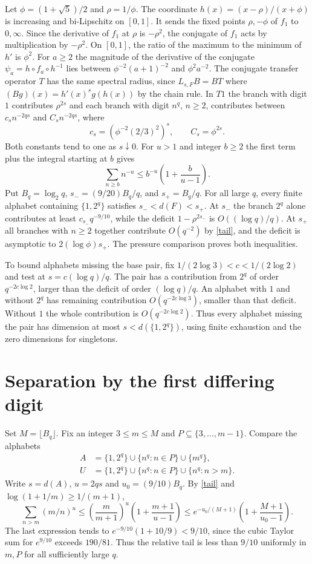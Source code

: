 \documentclass[11pt,a4paper]{amsart}
\begin{document}
Let $\phi=(1+\sqrt5)/2$ and $\rho=1/\phi$. The coordinate $h(x)=(x-\rho)/(x+\phi)$ is increasing and bi-Lipschitz on $[0,1]$. It sends the fixed points $\rho,-\phi$ of $f_1$ to $0,\infty$. Since the derivative of $f_1$ at $\rho$ is $-\rho^2$, the conjugate of $f_1$ acts by multiplication by $-\rho^2$. On $[0,1]$, the ratio of the maximum to the minimum of $h'$ is $\phi^2$. For $a\ge2$ the magnitude of the derivative of the conjugate $\psi_a=h\circ f_a\circ h^{-1}$ lies between $\phi^{-2}(a+1)^{-2}$ and $\phi^2a^{-2}$. The conjugate transfer operator $T$ has the same spectral radius, since $L_{s,F}B=BT$ where $(Bg)(x)=h'(x)^s g(h(x))$ by the chain rule. In $T1$ the branch with digit $1$ contributes $\rho^{2s}$ and each branch with digit $n^q$, $n\ge2$, contributes between $c_s n^{-2qs}$ and $C_s n^{-2qs}$, where
\[
c_s=(\phi^{-2}(2/3)^2)^s,\qquad C_s=\phi^{2s}.
\]
Both constants tend to one as $s\downarrow0$. For $u>1$ and integer $b\ge2$ the first term plus the integral starting at $b$ gives
\begin{equation}
\sum_{n\ge b}n^{-u}\le b^{-u}\left(1+\frac b{u-1}\right).
\label{tail}
\end{equation}
Put $B_q=\log_2q$, $s_-=(9/20) B_q/q$, and $s_+=B_q/q$. For all large $q$, every finite alphabet containing $\{1,2^q\}$ satisfies $s_-<d(F)<s_+$. At $s_-$ the branch $2^q$ alone contributes at least $c_{s_-}q^{-9/10}$, while the deficit $1-\rho^{2s_-}$ is $O((\log q)/q)$. At $s_+$ all branches with $n\ge2$ together contribute $O(q^{-2})$ by \eqref{tail}, and the deficit is asymptotic to $2(\log\phi)s_+$. The pressure comparison proves both inequalities.

To bound alphabets missing the base pair, fix $1/(2\log3)<c<1/(2\log2)$ and test at $s=c(\log q)/q$. The pair has a contribution from $2^q$ of order $q^{-2c\log 2}$, larger than the deficit of order $(\log q)/q$. An alphabet with $1$ and without $2^q$ has remaining contribution $O(q^{-2c\log 3})$, smaller than that deficit. Without $1$ the whole contribution is $O(q^{-2c\log 2})$. Thus every alphabet missing the pair has dimension at most $s<d(\{1,2^q\})$, using finite exhaustion and the zero dimensions for singletons.

\section{Separation by the first differing digit}
Set $M=\lfloor B_q\rfloor$. Fix an integer $3\le m\le M$ and $P\subseteq\{3,\ldots,m-1\}$. Compare the alphabets
\[
\begin{split}
A&=\{1,2^q\}\cup\{n^q:n\in P\}\cup\{m^q\},\\
U&=\{1,2^q\}\cup\{n^q:n\in P\}\cup\{n^q:n>m\}.
\end{split}
\]
Write $s=d(A)$, $u=2qs$ and $u_0=(9/10)B_q$. By \eqref{tail} and $\log(1+1/m)\ge 1/(m+1)$,
\[
\sum_{n>m}(m/n)^u
\le \left(\frac m{m+1}\right)^u\left(1+\frac{m+1}{u-1}\right)
\le e^{-u_0/(M+1)}\left(1+\frac{M+1}{u_0-1}\right).
\]
The last expression tends to $e^{-9/10}(1+10/9)<9/10$, since the cubic Taylor sum for $e^{9/10}$ exceeds $190/81$. Thus the relative tail is less than $9/10$ uniformly in $m,P$ for all sufficiently large $q$.
\end{document}
